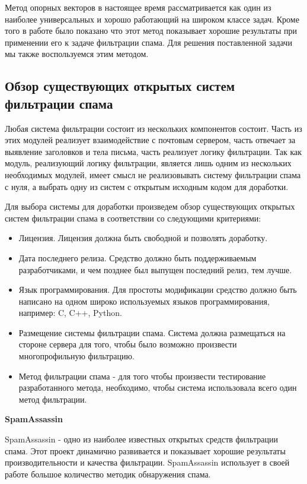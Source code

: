 Метод опорных векторов в настоящее время рассматривается как один из наиболее универсальных и хорошо работающий на широком классе задач. Кроме того в работе\cite{ROZ} было показано что этот метод показывает хорошие результаты при применении его к задаче фильтрации спама. Для решения поставленной задачи мы также воспользуемся этим методом.

\subsection{Обзор существующих открытых систем фильтрации спама}
Любая система фильтрации состоит из нескольких компонентов состоит. Часть из этих модулей реализует взаимодействие с почтовым сервером, часть отвечает за выявление заголовков и тела письма, часть реализует логику фильтрации. Так как модуль, реализующий логику фильтрации, является лишь одним из нескольких необходимых модулей, имеет смысл не реализовывать систему фильтрации спама с нуля, а выбрать одну из систем с открытым исходным кодом для доработки.

Для выбора системы для доработки произведем обзор существующих открытых систем фильтрации спама в соответствии со следующими критериями:
\begin{itemize}
\item Лицензия. Лицензия должна быть свободной и позволять доработку.
\item Дата последнего релиза. Средство должно быть поддерживаемым разработчиками, и чем позднее был выпущен последний релиз, тем лучше.
\item Язык программирования. Для простоты модификации средство должно быть написано на одном широко используемых языков программирования, например: C, C++, Python.
\item Размещение системы фильтрации спама. Система должна размещаться на стороне сервера для того, чтобы было возможно произвести многопрофильную фильтрацию. 
\item Метод фильтрации спама - для того чтобы произвести тестирование разработанного метода, необходимо, чтобы система использовала всего один метод фильтрации.
\end{itemize}

\textbf{SpamAssassin}

SpamAssassin - одно из наиболее известных открытых средств фильтрации спама. Этот проект динамично развивается и показывает хорошие результаты производительности и качества фильтрации. SpamAssassin использует в своей работе большое количество методик обнаружения спама.

